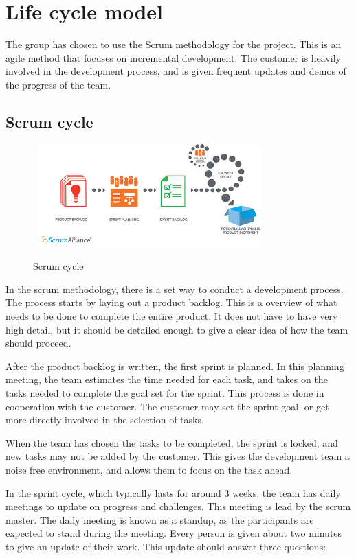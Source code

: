 \documentclass[11pt,a4paper,titlepage,oneside]{report}
\begin{document}
\section{Life cycle model}
\label{sec:Scrum}
The group has chosen to use the Scrum methodology for the project. This is an agile method that focuses on incremental development. The customer is heavily involved in the development process, and is given frequent updates and demos of the progress of the team. 

\subsection{Scrum cycle}
\begin{figure}[h]
\begin{center}
\includegraphics[height=150px,width=340px]{img/Scrum.jpg}
\caption{Scrum cycle}\cite{ScrumCycle}
\label{fig:gantt}
\medskip
\small
\end{center}
\end{figure}

In the scrum methodology, there is a set way to conduct a development process. The process starts by laying out a product backlog. This is a overview of what needs to be done to complete the entire product. It does not have to have very high detail, but it should be detailed enough to give a clear idea of how the team should proceed. 

After the product backlog is written, the first sprint is planned. In this planning meeting, the team estimates the time needed for each task, and takes on the tasks needed to complete the goal set for the sprint. This process is done in cooperation with the customer. The customer may set the sprint goal, or get more directly involved in the selection of tasks. 

When the team has chosen the tasks to be completed, the sprint is locked, and new tasks may not be added by the customer. This gives the development team a noise free environment, and allows them to focus on the task ahead. 

In the sprint cycle, which typically lasts for around 3 weeks, the team has daily meetings to update on progress and challenges. This meeting is lead by the scrum master. The daily meeting is known as a standup, as the participants are expected to stand during the meeting. Every person is given about two minutes to give an update of their work. This update should answer three questions:
\end{document}
